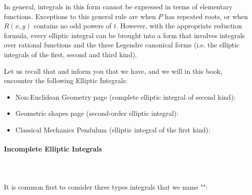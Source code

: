 	In general, integrals in this form cannot be expressed in terms of elementary functions. Exceptions to this general rule are when $P$ has repeated roots, or when $R(x,y)$ contains no odd powers of $t$. However, with the appropriate reduction formula, every elliptic integral can be brought into a form that involves integrals over rational functions and the three Legendre canonical forms (i.e. the elliptic integrals of the first, second and third kind).

	Let us recall that and inform you that we have, and we will in this book, encounter the following Elliptic Integrals:
	\begin{itemize}
		\item Non-Euclidean Geometry page \pageref{elliptic integral riemann space} (complete elliptic integral of second kind):
		
		
		\item Geometric shapes page \pageref{elliptic integral ellipse perimeter} (second-order elliptic integral):
		
		
		\item Classical Mechanics Pendulum \pageref{elliptic integral pendulum} (elliptic integral of the first kind):
		
	\end{itemize}
	
	\paragraph{Incomplete Elliptic Integrals}\label{incomplete elliptic integrals}\mbox{}\\\\
	It is common first to consider three types integrals that we name "":
	
